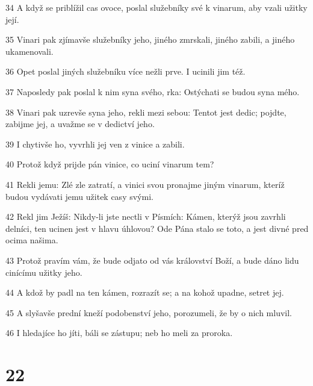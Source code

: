 \par 34 A když se priblížil cas ovoce, poslal služebníky své k vinarum, aby vzali užitky její.
\par 35 Vinari pak zjímavše služebníky jeho, jiného zmrskali, jiného zabili, a jiného ukamenovali.
\par 36 Opet poslal jiných služebníku více nežli prve. I ucinili jim též.
\par 37 Naposledy pak poslal k nim syna svého, rka: Ostýchati se budou syna mého.
\par 38 Vinari pak uzrevše syna jeho, rekli mezi sebou: Tentot jest dedic; pojdte, zabijme jej, a uvažme se v dedictví jeho.
\par 39 I chytivše ho, vyvrhli jej ven z vinice a zabili.
\par 40 Protož když prijde pán vinice, co uciní vinarum tem?
\par 41 Rekli jemu: Zlé zle zatratí, a vinici svou pronajme jiným vinarum, kteríž budou vydávati jemu užitek casy svými.
\par 42 Rekl jim Ježíš: Nikdy-li jste nectli v Písmích: Kámen, kterýž jsou zavrhli delníci, ten ucinen jest v hlavu úhlovou? Ode Pána stalo se toto, a jest divné pred ocima našima.
\par 43 Protož pravím vám, že bude odjato od vás království Boží, a bude dáno lidu cinícímu užitky jeho.
\par 44 A kdož by padl na ten kámen, rozrazít se; a na kohož upadne, setret jej.
\par 45 A slyšavše prední kneží podobenství jeho, porozumeli, že by o nich mluvil.
\par 46 I hledajíce ho jíti, báli se zástupu; neb ho meli za proroka.

\chapter{22}

